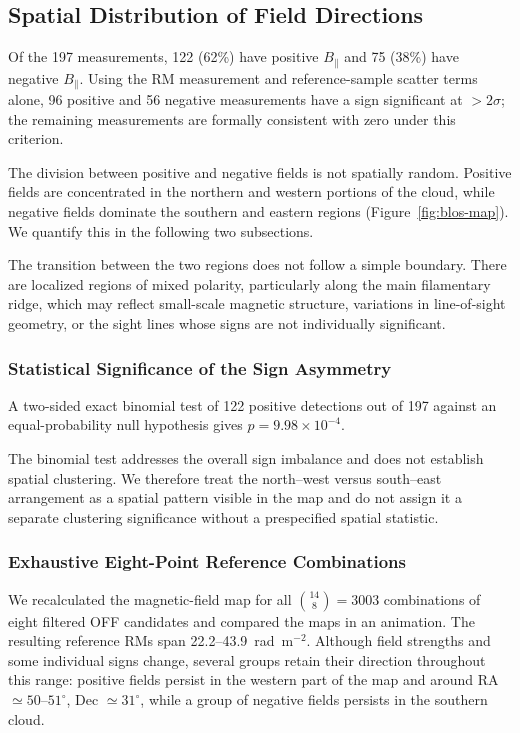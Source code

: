\documentclass[twocolumn]{aastex701}
\begin{document}
\subsection{Spatial Distribution of Field Directions}
\label{sec:signs}

Of the 197 measurements, 122 (62\%) have positive $B_\parallel$ and 75 (38\%)
have negative $B_\parallel$. Using the RM measurement and reference-sample
scatter terms alone, 96 positive and 56 negative measurements have a sign
significant at $>2\sigma$; the remaining measurements are formally
consistent with zero under this criterion.

The division between positive and negative fields is not spatially random.
Positive fields are concentrated in the northern and western portions of the
cloud, while negative fields dominate the southern and eastern regions
(Figure~\ref{fig:blos-map}). We quantify this in the following two
subsections.

The transition between the two regions does not follow a simple boundary.
There are localized regions of mixed polarity, particularly along the main
filamentary ridge, which may reflect small-scale magnetic structure,
variations in line-of-sight geometry, or the sight lines whose signs are not
individually significant.

\subsubsection{Statistical Significance of the Sign Asymmetry}
\label{sec:sign-tests}

A two-sided exact binomial test of 122 positive detections out of 197 against
an equal-probability null hypothesis gives $p=9.98\times10^{-4}$.

The binomial test addresses the overall sign imbalance and does not establish
spatial clustering. We therefore treat the north--west versus south--east
arrangement as a spatial pattern visible in the map and do not assign it a
separate clustering significance without a prespecified spatial statistic.


\subsubsection{Exhaustive Eight-Point Reference Combinations}
\label{sec:all-reference-combinations}
\label{sec:rmref-sensitivity}

We recalculated the magnetic-field map for all $\binom{14}{8}=3003$
combinations of eight filtered OFF candidates and compared the maps in an
animation. The resulting reference RMs span 22.2--43.9~rad~m$^{-2}$.
Although field strengths and some individual signs change, several groups
retain their direction throughout this range: positive fields persist in
the western part of the map and around RA $\simeq50$--$51^\circ$,
Dec $\simeq31^\circ$, while a group of negative fields persists in the
southern cloud.
\end{document}
